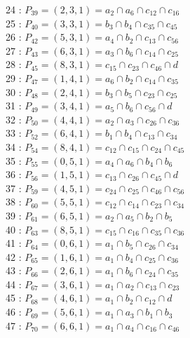 24 : $P_{39}=( 2, 3, 1 ) = a_{2} \cap a_{6} \cap c_{12} \cap c_{16}$\\
25 : $P_{40}=( 3, 3, 1 ) = b_{3} \cap b_{4} \cap c_{35} \cap c_{45}$\\
26 : $P_{42}=( 5, 3, 1 ) = a_{4} \cap b_{2} \cap c_{13} \cap c_{56}$\\
27 : $P_{43}=( 6, 3, 1 ) = a_{3} \cap b_{6} \cap c_{14} \cap c_{25}$\\
28 : $P_{45}=( 8, 3, 1 ) = c_{15} \cap c_{23} \cap c_{46} \cap d$\\
29 : $P_{47}=( 1, 4, 1 ) = a_{6} \cap b_{2} \cap c_{14} \cap c_{35}$\\
30 : $P_{48}=( 2, 4, 1 ) = b_{3} \cap b_{5} \cap c_{23} \cap c_{25}$\\
31 : $P_{49}=( 3, 4, 1 ) = a_{5} \cap b_{6} \cap c_{56} \cap d$\\
32 : $P_{50}=( 4, 4, 1 ) = a_{2} \cap a_{3} \cap c_{26} \cap c_{36}$\\
33 : $P_{52}=( 6, 4, 1 ) = b_{1} \cap b_{4} \cap c_{13} \cap c_{34}$\\
34 : $P_{54}=( 8, 4, 1 ) = c_{12} \cap c_{15} \cap c_{24} \cap c_{45}$\\
35 : $P_{55}=( 0, 5, 1 ) = a_{4} \cap a_{6} \cap b_{4} \cap b_{6}$\\
36 : $P_{56}=( 1, 5, 1 ) = c_{13} \cap c_{26} \cap c_{45} \cap d$\\
37 : $P_{59}=( 4, 5, 1 ) = c_{24} \cap c_{25} \cap c_{46} \cap c_{56}$\\
38 : $P_{60}=( 5, 5, 1 ) = c_{12} \cap c_{14} \cap c_{23} \cap c_{34}$\\
39 : $P_{61}=( 6, 5, 1 ) = a_{2} \cap a_{5} \cap b_{2} \cap b_{5}$\\
40 : $P_{63}=( 8, 5, 1 ) = c_{15} \cap c_{16} \cap c_{35} \cap c_{36}$\\
41 : $P_{64}=( 0, 6, 1 ) = a_{1} \cap b_{5} \cap c_{26} \cap c_{34}$\\
42 : $P_{65}=( 1, 6, 1 ) = a_{1} \cap b_{4} \cap c_{25} \cap c_{36}$\\
43 : $P_{66}=( 2, 6, 1 ) = a_{1} \cap b_{6} \cap c_{24} \cap c_{35}$\\
44 : $P_{67}=( 3, 6, 1 ) = a_{1} \cap a_{2} \cap c_{13} \cap c_{23}$\\
45 : $P_{68}=( 4, 6, 1 ) = a_{1} \cap b_{2} \cap c_{12} \cap d$\\
46 : $P_{69}=( 5, 6, 1 ) = a_{1} \cap a_{3} \cap b_{1} \cap b_{3}$\\
47 : $P_{70}=( 6, 6, 1 ) = a_{1} \cap a_{4} \cap c_{16} \cap c_{46}$\\

